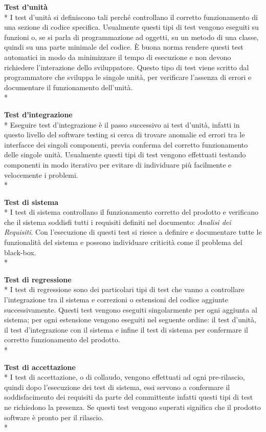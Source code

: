 				\textbf{Test d'unità} \\*
				I test d'unità si definiscono tali perché controllano il corretto funzionamento di una sezione di codice specifica. Usualmente questi tipi di test vengono eseguiti su funzioni o, se si parla di programmazione ad oggetti, su un metodo di una classe, quindi su una parte minimale del codice. È buona norma rendere questi test automatici in modo da minimizzare il tempo di esecuzione e non devono richiedere l'interazione dello sviluppatore. Questo tipo di test viene scritto dal programmatore che sviluppa le singole unità, per verificare l'assenza di errori e documentare il funzionamento dell'unità. \\*
				
				
				\textbf{Test d'integrazione} \\*
				Eseguire test d'integrazione è il passo successivo ai test d'unità, infatti in questo livello del software testing si cerca di trovare anomalie ed errori tra le interfacce dei singoli componenti, previa conferma del corretto funzionamento delle singole unità. Usualmente questi tipi di test vengono effettuati testando componenti in modo iterativo per evitare di individuare più facilmente e velocemente i problemi. \\*
				
				\textbf{Test di sistema} \\*
				I test di sistema controllano il funzionamento corretto del prodotto e verificano che il sistema soddisfi tutti i requisiti definiti nel documento: \textit{Analisi dei Requisiti}. Con l'esecuzione di questi test si riesce a definire e documentare tutte le funzionalità del sistema e possono individuare criticità come il problema del black-box\glo.
				\\*
				
				\textbf{Test di regressione} \\*
				I test di regressione sono dei particolari tipi di test che vanno a controllare l'integrazione tra il sistema e correzioni o estensioni del codice aggiunte successivamente. Questi test vengono eseguiti singolarmente per ogni aggiunta al sistema; per ogni estensione vengono eseguiti nel seguente ordine: il test d'unità, il test d'integrazione con il sistema e infine il test di sistema per confermare il corretto funzionamento del prodotto. \\*
				
				\textbf{Test di accettazione} \\*
				I test di accettazione, o di collaudo, vengono effettuati ad ogni pre-rilascio, quindi dopo l'esecuzione dei test di sistema, essi servono a confermare il soddisfacimento dei requisiti da parte del committente infatti questi tipi di test ne richiedono la presenza. Se questi test vengono superati significa che il prodotto software è pronto per il rilascio. \\*